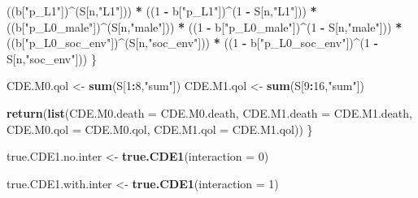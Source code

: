 \documentclass[
]{book}
\newenvironment{Shaded}{\begin{snugshade}}{\end{snugshade}}
\newcommand{\AttributeTok}[1]{\textcolor[rgb]{0.13,0.29,0.53}{#1}}
\newcommand{\DecValTok}[1]{\textcolor[rgb]{0.00,0.00,0.81}{#1}}
\newcommand{\FunctionTok}[1]{\textcolor[rgb]{0.13,0.29,0.53}{\textbf{#1}}}
\newcommand{\NormalTok}[1]{#1}
\newcommand{\OtherTok}[1]{\textcolor[rgb]{0.56,0.35,0.01}{#1}}
\newcommand{\SpecialCharTok}[1]{\textcolor[rgb]{0.81,0.36,0.00}{\textbf{#1}}}
\newcommand{\StringTok}[1]{\textcolor[rgb]{0.31,0.60,0.02}{#1}}
\begin{document}
\begin{Shaded}
\begin{Highlighting}[]
\NormalTok{      ((b[}\StringTok{"p\_L1"}\NormalTok{])}\SpecialCharTok{\^{}}\NormalTok{(S[n,}\StringTok{"L1"}\NormalTok{])) }\SpecialCharTok{*}
\NormalTok{      ((}\DecValTok{1} \SpecialCharTok{{-}}\NormalTok{ b[}\StringTok{"p\_L1"}\NormalTok{])}\SpecialCharTok{\^{}}\NormalTok{(}\DecValTok{1} \SpecialCharTok{{-}}\NormalTok{ S[n,}\StringTok{"L1"}\NormalTok{])) }\SpecialCharTok{*}
\NormalTok{      ((b[}\StringTok{"p\_L0\_male"}\NormalTok{])}\SpecialCharTok{\^{}}\NormalTok{(S[n,}\StringTok{"male"}\NormalTok{])) }\SpecialCharTok{*} 
\NormalTok{      ((}\DecValTok{1} \SpecialCharTok{{-}}\NormalTok{ b[}\StringTok{"p\_L0\_male"}\NormalTok{])}\SpecialCharTok{\^{}}\NormalTok{(}\DecValTok{1} \SpecialCharTok{{-}}\NormalTok{ S[n,}\StringTok{"male"}\NormalTok{])) }\SpecialCharTok{*} 
\NormalTok{      ((b[}\StringTok{"p\_L0\_soc\_env"}\NormalTok{])}\SpecialCharTok{\^{}}\NormalTok{(S[n,}\StringTok{"soc\_env"}\NormalTok{])) }\SpecialCharTok{*}
\NormalTok{      ((}\DecValTok{1} \SpecialCharTok{{-}}\NormalTok{ b[}\StringTok{"p\_L0\_soc\_env"}\NormalTok{])}\SpecialCharTok{\^{}}\NormalTok{(}\DecValTok{1} \SpecialCharTok{{-}}\NormalTok{ S[n,}\StringTok{"soc\_env"}\NormalTok{])) }
\NormalTok{    \}}
  
\NormalTok{  CDE.M0.qol }\OtherTok{\textless{}{-}} \FunctionTok{sum}\NormalTok{(S[}\DecValTok{1}\SpecialCharTok{:}\DecValTok{8}\NormalTok{,}\StringTok{"sum"}\NormalTok{])}
\NormalTok{  CDE.M1.qol }\OtherTok{\textless{}{-}} \FunctionTok{sum}\NormalTok{(S[}\DecValTok{9}\SpecialCharTok{:}\DecValTok{16}\NormalTok{,}\StringTok{"sum"}\NormalTok{])}
  
  \FunctionTok{return}\NormalTok{(}\FunctionTok{list}\NormalTok{(}\AttributeTok{CDE.M0.death =}\NormalTok{ CDE.M0.death, }\AttributeTok{CDE.M1.death =}\NormalTok{ CDE.M1.death, }
              \AttributeTok{CDE.M0.qol =}\NormalTok{ CDE.M0.qol, }\AttributeTok{CDE.M1.qol =}\NormalTok{ CDE.M1.qol))}
\NormalTok{\}}
\end{Highlighting}
\end{Shaded}

\begin{Shaded}
\begin{Highlighting}[]
\NormalTok{true.CDE1.no.inter }\OtherTok{\textless{}{-}} \FunctionTok{true.CDE1}\NormalTok{(}\AttributeTok{interaction =} \DecValTok{0}\NormalTok{)}

\NormalTok{true.CDE1.with.inter }\OtherTok{\textless{}{-}} \FunctionTok{true.CDE1}\NormalTok{(}\AttributeTok{interaction =} \DecValTok{1}\NormalTok{)}
\end{Highlighting}
\end{Shaded}
\end{document}
